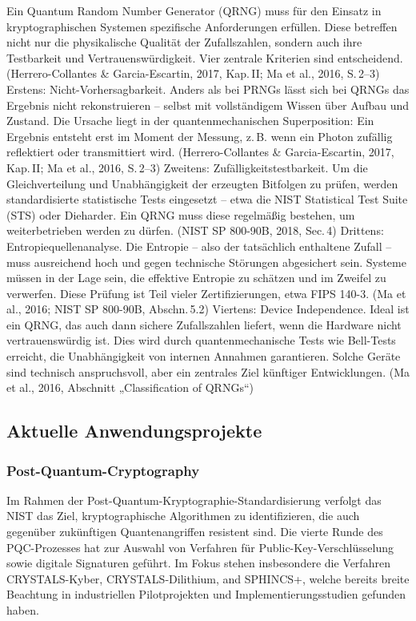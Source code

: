 \noindent
Ein Quantum Random Number Generator (QRNG) muss für den Einsatz in kryptographischen Systemen spezifische Anforderungen erfüllen. Diese betreffen nicht nur die physikalische Qualität der Zufallszahlen, sondern auch ihre Testbarkeit und Vertrauenswürdigkeit. Vier zentrale Kriterien sind entscheidend.
 (Herrero-Collantes & Garcia-Escartin, 2017, Kap. II; Ma et al., 2016, S. 2–3)
Erstens: Nicht-Vorhersagbarkeit. Anders als bei PRNGs lässt sich bei QRNGs das Ergebnis nicht rekonstruieren – selbst mit vollständigem Wissen über Aufbau und Zustand. Die Ursache liegt in der quantenmechanischen Superposition: Ein Ergebnis entsteht erst im Moment der Messung, z. B. wenn ein Photon zufällig reflektiert oder transmittiert wird.
 (Herrero-Collantes & Garcia-Escartin, 2017, Kap. II; Ma et al., 2016, S. 2–3)
Zweitens: Zufälligkeitstestbarkeit. Um die Gleichverteilung und Unabhängigkeit der erzeugten Bitfolgen zu prüfen, werden standardisierte statistische Tests eingesetzt – etwa die NIST Statistical Test Suite (STS) oder Dieharder. Ein QRNG muss diese regelmäßig bestehen, um weiterbetrieben werden zu dürfen.
 (NIST SP 800-90B, 2018, Sec. 4)
Drittens: Entropiequellenanalyse. Die Entropie – also der tatsächlich enthaltene Zufall – muss ausreichend hoch und gegen technische Störungen abgesichert sein. Systeme müssen in der Lage sein, die effektive Entropie zu schätzen und im Zweifel zu verwerfen. Diese Prüfung ist Teil vieler Zertifizierungen, etwa FIPS 140-3.
 (Ma et al., 2016; NIST SP 800-90B, Abschn. 5.2)
Viertens: Device Independence. Ideal ist ein QRNG, das auch dann sichere Zufallszahlen liefert, wenn die Hardware nicht vertrauenswürdig ist. Dies wird durch quantenmechanische Tests wie Bell-Tests erreicht, die Unabhängigkeit von internen Annahmen garantieren. Solche Geräte sind technisch anspruchsvoll, aber ein zentrales Ziel künftiger Entwicklungen.
 (Ma et al., 2016, Abschnitt „Classification of QRNGs“)
 
\subsection{Aktuelle Anwendungsprojekte}
\subsubsection{Post-Quantum-Cryptography}
\cite{}
Im Rahmen der Post-Quantum-Kryptographie-Standardisierung verfolgt das NIST das Ziel, kryptographische Algorithmen zu identifizieren, die auch gegenüber zukünftigen Quantenangriffen resistent sind. Die vierte Runde des PQC-Prozesses hat zur Auswahl von Verfahren für Public-Key-Verschlüsselung sowie digitale Signaturen geführt. Im Fokus stehen insbesondere die Verfahren CRYSTALS-Kyber, CRYSTALS-Dilithium, and SPHINCS+, welche bereits breite Beachtung in industriellen Pilotprojekten und Implementierungsstudien gefunden haben.


